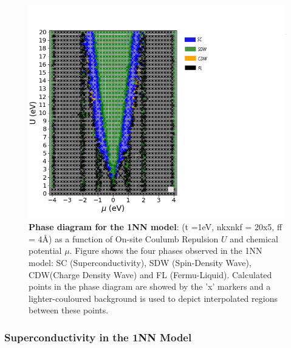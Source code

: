 \documentclass[12pt]{article}
\begin{document}
\begin{figure}[htbp]  %
    \centering
    \includegraphics[width=1.25\textwidth]{1NNphasediagram.png}  %
    \caption{\textbf{Phase diagram for the 1NN model}:  (t =1eV, nkxnkf = 20x5, ff = 4\AA) as a function of On-site Coulumb Repulsion $U$ and chemical potential $\mu$. 
    Figure shows the four phases observed in the 1NN model: SC (Superconductivity), SDW (Spin-Density Wave), CDW(Charge Density Wave) and FL (Fermu-Liquid).
    Calculated points in the phase diagram are showed by the 'x' markers and a lighter-couloured background is used to depict interpolated regions between these points. }
    \label{fig:1NNpd}
\end{figure}

\newpage


\subsubsection{Superconductivity in the 1NN Model}
\end{document}
